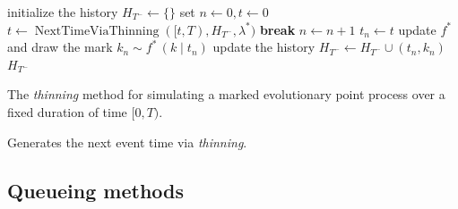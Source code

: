 \documentclass{juliacon}
\numberwithin{equation}{section}
\newcommand\ubar[1]{\stackunder[1.2pt]{\(#1\)}{\rule{.8ex}{.075ex}}}
\begin{document}
\begin{algorithm}[h]
\begin{algorithmic}[1]
  \Procedure{ThinningMethod}{\( [0, T) \), \( \lambda^\ast \), \( f^\ast \),}
    \State initialize the history \( H_{T^-} \leftarrow \{ \} \)
    \State set \( n \leftarrow 0, t \leftarrow 0 \)
      \State \( t \leftarrow \operatorname{NextTimeViaThinning}([t, T), H_{T^-}, \lambda^\ast) \)
        \State \textbf{break}
      \EndIf
      \State \( n \leftarrow n + 1 \)
      \State \( t_n \leftarrow t \)
      \State update  \( f^\ast \) and draw the mark \( k_n \sim f^\ast \, (k \mid t_n) \) \label{line:thinning-mark-sample}
      \State update the history \( H_{T^-} \leftarrow H_{T^-} \cup (t_n, k_n) \) \label{line:thinning-history-update}
    \EndWhile
    \State \Return \( H_{T^-} \)
  \EndProcedure
\end{algorithmic}
\caption{The \textit{thinning} method for simulating a marked evolutionary point process over a fixed duration of time \( [0, T) \).}
\label{algo:sim-thinning}
\end{algorithm}

\begin{algorithm}[h]
\begin{algorithmic}[1]
  \Procedure{NextTimeViaThinning}{\([t, T) \), \( \lambda^\ast \), \( H_{t} \),}
        \State update \( \lambda^\ast \) \label{line:lambda-update}
        \State find \( \bar{B}^\ast (t) \), \( \ubar{B}^\ast (t) \) and \( L^\ast(t) \) which satisfy Eq.~\ref{eq:thinning-condition}
        \State draw \( u \sim \exp(\bar{B}^\ast(t)) \) and \( v \sim U[0, \bar{B}^\ast(t)] \) \label{line:short-circuit}
        \If{\( u > L^\ast(t) \)}
          \State \( t \leftarrow t + L^\ast(t) \)
          \State \textbf{next}
        \EndIf
        \If{\( ( v > \ubar{B}^\ast(t) ) \) and \( ( v > \lambda^\ast \, (t + u) ) \)}
          \State \( t \leftarrow t + u \)
          \State \textbf{next}
        \EndIf
        \State \( t \leftarrow t + u \)
        \State \textbf{break}
      \EndWhile
      \State \Return t
  \EndProcedure
\end{algorithmic}
\caption{Generates the next event time via \textit{thinning}.}
\label{algo:next-time-thinning}
\end{algorithm}

\subsection{Queueing methods} \label{subsec:sim-queueing}
\end{document}
